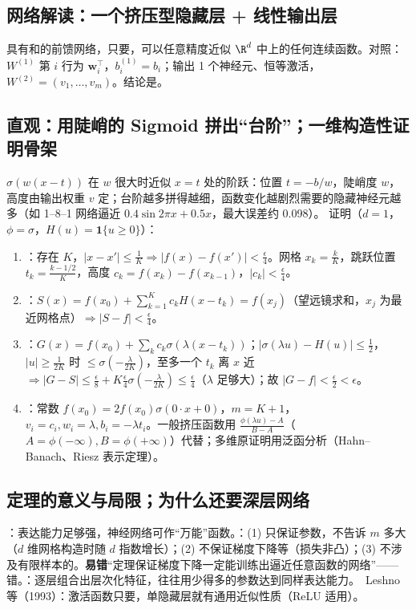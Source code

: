 \subsection{网络解读：一个挤压型隐藏层 + 线性输出层}
具有和的前馈网络，只要，可以任意精度近似 $\R^d$ 中上的任何连续函数。对照：$W^{(1)}$ 第 $i$ 行为 $\bm w_i^\top$，$b^{(1)}_i=b_i$；输出 1 个神经元、恒等激活，$W^{(2)}=(v_1,\dots,v_m)$。结论是。

\subsection{直观：用陡峭的 Sigmoid 拼出“台阶”；一维构造性证明骨架}
$\sigma(w(x-t))$ 在 $w$ 很大时近似 $x=t$ 处的阶跃：位置 $t=-b/w$，陡峭度 $w$，高度由输出权重 $v$ 定；台阶越多拼得越细，函数变化越剧烈需要的隐藏神经元越多（如 1--8--1 网络逼近 $0.4\sin2\pi x+0.5x$，最大误差约 0.098）。
证明（$d=1$，$\phi=\sigma$，$H(u)=\mathbf 1\{u\ge0\}$）：
\begin{enumerate}
\item {}：存在 $K$，$|x-x'|\le\frac1K\Rightarrow|f(x)-f(x')|<\frac\epsilon4$。网格 $x_k=\frac kK$，跳跃位置 $t_k=\frac{k-1/2}{K}$，高度 $c_k=f(x_k)-f(x_{k-1})$，$|c_k|<\frac\epsilon4$。
\item {}：$S(x)=f(x_0)+\sum_{k=1}^Kc_kH(x-t_k)=f(x_j)$（望远镜求和，$x_j$ 为最近网格点）$\Rightarrow|S-f|<\frac\epsilon4$。
\item {}：$G(x)=f(x_0)+\sum_kc_k\sigma(\lambda(x-t_k))$；$|\sigma(\lambda u)-H(u)|\le\frac12$，$|u|\ge\frac1{2K}$ 时 $\le\sigma(-\frac\lambda{2K})$，至多一个 $t_k$ 离 $x$ 近 $\Rightarrow|G-S|\le\frac\epsilon8+K\frac\epsilon4\sigma(-\frac\lambda{2K})\le\frac\epsilon4$（$\lambda$ 足够大）；故 $|G-f|<\frac\epsilon2<\epsilon$。
\item {}：常数 $f(x_0)=2f(x_0)\sigma(0\cdot x+0)$，$m=K+1$，$v_i=c_i,w_i=\lambda,b_i=-\lambda t_i$。一般挤压函数用 $\frac{\phi(\lambda u)-A}{B-A}$（$A=\phi(-\infty),B=\phi(+\infty)$）代替；多维原证明用泛函分析（Hahn--Banach、Riesz 表示定理）。
\end{enumerate}

\subsection{定理的意义与局限；为什么还要深层网络}
：表达能力足够强，神经网络可作“万能”函数。：(1) 只保证参数，不告诉 $m$ 多大（$d$ 维网格构造时随 $d$ 指数增长）；(2) 不保证梯度下降等（损失非凸）；(3) 不涉及有限样本的。\textbf{易错}“定理保证梯度下降一定能训练出逼近任意函数的网络”——错。：逐层组合出层次化特征，往往用少得多的参数达到同样表达能力。\tagext\ Leshno 等（1993）：激活函数只要，单隐藏层就有通用近似性质（ReLU 适用）。


